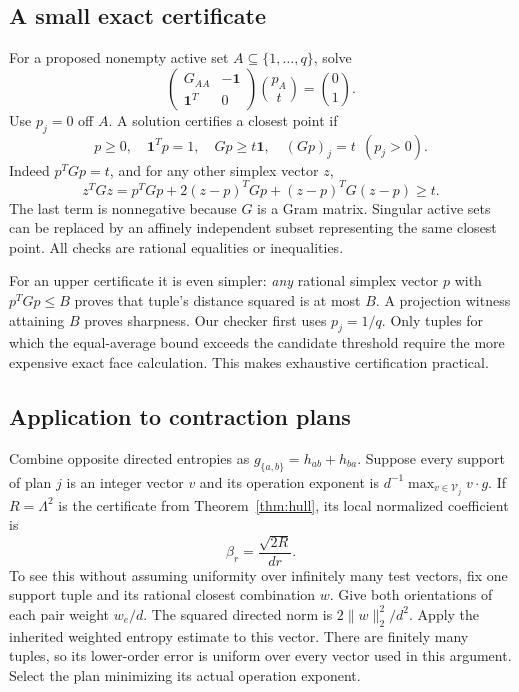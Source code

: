 \subsection{A small exact certificate}

For a proposed nonempty active set $A\subseteq\{1,\ldots,q\}$, solve
\begin{equation}\label{eq:hull-kkt}
 \begin{pmatrix}G_{AA}&-\mathbf1\\\mathbf1^T&0\end{pmatrix}
 \binom{p_A}{t}=\binom{0}{1}.
\end{equation}
Use $p_j=0$ off $A$. A solution certifies a closest point if
\[
 p\ge0,\quad \mathbf1^Tp=1,\quad Gp\ge t\mathbf1,
 \quad (Gp)_j=t\ \ (p_j>0).
\]
Indeed $p^TGp=t$, and for any other simplex vector $z$,
\[
 z^TGz=p^TGp+2(z-p)^TGp+(z-p)^TG(z-p)\ge t.
\]
The last term is nonnegative because $G$ is a Gram matrix. Singular active sets
can be replaced by an affinely independent subset representing the same
closest point. All checks are rational equalities or inequalities.

For an upper certificate it is even simpler: \emph{any} rational simplex
vector $p$ with $p^TGp\le B$ proves that tuple's distance squared is at
most $B$. A projection witness attaining $B$ proves sharpness. Our
checker first uses $p_j=1/q$. Only tuples for which the equal-average
bound exceeds the candidate threshold require the more expensive exact
face calculation. This makes exhaustive certification practical.

\subsection{Application to contraction plans}

Combine opposite directed entropies as
$g_{\{a,b\}}=h_{ab}+h_{ba}$. Suppose every support of plan $j$ is an
integer vector $v$ and its operation exponent is
$d^{-1}\max_{v\in\mathcal V_j}v\cdot g$. If $R=\Lambda^2$ is the
certificate from Theorem~\ref{thm:hull}, its local normalized coefficient is
\begin{equation}\label{eq:beta-hull}
 \beta_r=\frac{\sqrt{2R}}{dr}.
\end{equation}
To see this without assuming uniformity over infinitely many test vectors,
fix one support tuple and its rational closest combination $w$. Give both
orientations of each pair weight $w_e/d$. The squared directed norm is
$2\|w\|_2^2/d^2$. Apply the inherited weighted entropy estimate to this
vector. There are finitely many tuples, so its lower-order error is uniform
over every vector used in this argument. Select the plan minimizing its
actual operation exponent.

